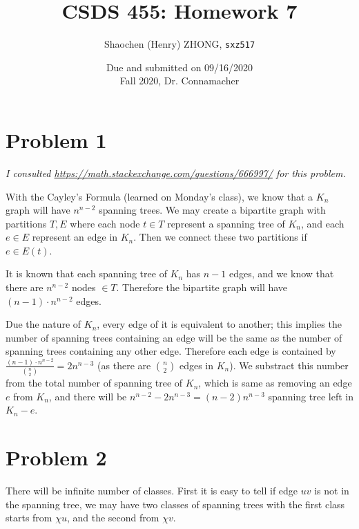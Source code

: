 \documentclass[11pt]{article}
\newcommand{\ilc}{\texttt}
\begin{document}
\title{\textbf{CSDS 455: Homework 7}}

\author{Shaochen (Henry) ZHONG, \ilc{sxz517}}
\date{Due and submitted on 09/16/2020 \\ Fall 2020, Dr. Connamacher}
\maketitle

\section*{Problem 1}

\textit{I consulted \url{https://math.stackexchange.com/questions/666997/} for this problem.}\newline

With the Cayley's Formula (learned on Monday's class), we know that a $K_n$ graph will have $n^{n-2}$ spanning trees. We may create a bipartite graph with partitions $T, E$ where each node $t \in T$ represent a spanning tree of $K_n$, and each $e \in E$ represent an edge in $K_n$. Then we connect these two partitions if $e \in E(t)$.

It is known that each spanning tree of $K_n$ has $n-1$ edges, and we know that there are $n^{n-2}$ nodes $\in T$. Therefore the bipartite graph will have $(n-1) \cdot n^{n-2}$ edges. \newline

Due the nature of $K_n$, every edge of it is equivalent to another; this implies the number of spanning trees containing an edge will be the same as the number of spanning trees containing any other edge. Therefore each edge is contained by $\frac{(n-1) \cdot n^{n-2}}{{n \choose 2}} = 2n^{n-3}$ (as there are ${n \choose 2}$ edges in $K_n$). We substract this number from the total number of spanning tree of $K_n$, which is same as removing an edge $e$ from $K_n$, and there will be $ n^{n-2} - 2n^{n-3} = (n-2)n^{n-3}$ spanning tree left in $K_n - e$.

\section*{Problem 2}

There will be infinite number of classes. First it is easy to tell if edge $uv$ is not in the spanning tree, we may have two classes of spanning trees with the first class starts from $\chi u$, and the second from $\chi v$.\newline
\end{document}
